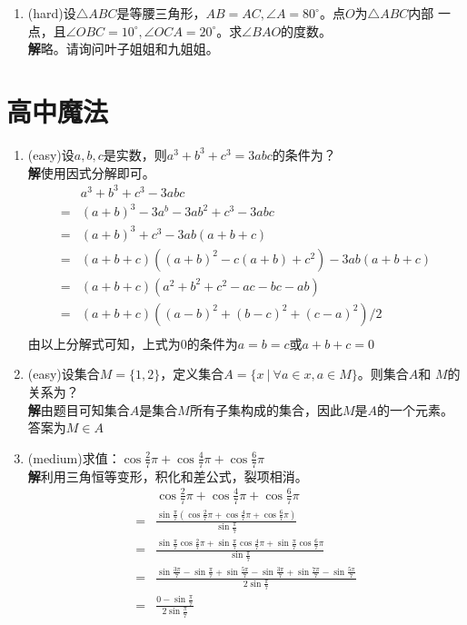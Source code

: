 \documentclass[a4paper]{article}
\begin{document}
\begin{enumerate}
\item (hard)设$\triangle ABC$是等腰三角形，$AB=AC,\angle A=80^\circ$。点$O$为$\triangle ABC$内部
一点，且$\angle OBC=10^\circ,\angle OCA=20^\circ$。求$\angle BAO$的度数。\\
\textbf{解}\quad 略。请询问叶子姐姐和九姐姐。
\end{enumerate}
\section{高中魔法}
\begin{enumerate}
\item (easy)设$a,b,c$是实数，则$a^3+b^3+c^3=3abc$的条件为？\\
\textbf{解}\quad 使用因式分解即可。
\[
\begin{split}
&a^3+b^3+c^3-3abc\\
=&(a+b)^3-3a^b-3ab^2+c^3-3abc\\
=&(a+b)^3+c^3-3ab(a+b+c)\\
=&(a+b+c)((a+b)^2-c(a+b)+c^2)-3ab(a+b+c)\\
=&(a+b+c)(a^2+b^2+c^2-ac-bc-ab)\\
=&(a+b+c)((a-b)^2+(b-c)^2+(c-a)^2)/2\\
\end{split}
\]
由以上分解式可知，上式为0的条件为$a=b=c$或$a+b+c=0$
\item (easy)设集合$M=\{1,2\}$，定义集合$A=\{x~|~\forall a \in x, a \in M \}$。则集合$A$和
$M$的关系为？\\
\textbf{解}\quad 由题目可知集合$A$是集合$M$所有子集构成的集合，因此$M$是$A$的一个元素。答案为$M\in A$
\item (medium)求值：$\cos\frac{2}{7}\pi+\cos\frac{4}{7}\pi+\cos\frac{6}{7}\pi$\\
\textbf{解}\quad 利用三角恒等变形，积化和差公式，裂项相消。
\[
\begin{split}
&\cos\frac{2}{7}\pi+\cos\frac{4}{7}\pi+\cos\frac{6}{7}\pi\\
=&\frac{\sin\frac{\pi}{7}(\cos\frac{2}{7}\pi+\cos\frac{4}{7}\pi+\cos\frac{6}{7}\pi)}{\sin\frac{\pi}{7}}\\
=&\frac{\sin\frac{\pi}{7}\cos\frac{2}{7}\pi+\sin\frac{\pi}{7}\cos\frac{4}{7}\pi+\sin\frac{\pi}{7}\cos\frac{6}{7}\pi}{\sin\frac{\pi}{7}}\\
=&\frac{\sin\frac{3\pi}{7}-\sin\frac{\pi}{7}+\sin\frac{5\pi}{7}-\sin\frac{3\pi}{7}+\sin\frac{7\pi}{7}-\sin\frac{5\pi}{7}}{2\sin\frac{\pi}{7}}\\
=&\frac{0-\sin\frac{\pi}{7}}{2\sin\frac{\pi}{7}}\\

\end{split}\]
\end{enumerate}
\end{document}
